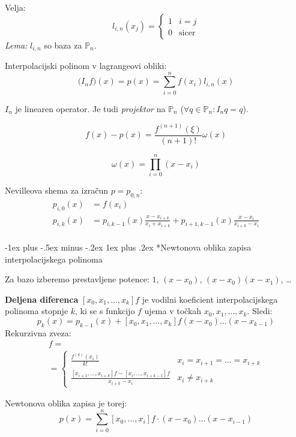\documentclass[a3paper,9pt]{extarticle}
\makeatletter
\renewcommand{\subsubsection}{\@startsection{subsubsection}{3}{0mm}%
                                {-1ex plus -.5ex minus -.2ex}%
                                {1ex plus .2ex}%
                                {\normalfont\small\bfseries}}
\makeatother
\begin{document}
\begin{multicols}{5}
Velja:
\[ 
l_{i,n}(x_j) = 
\begin{cases}
    1 & i = j \\
    0 & \text{sicer}
\end{cases}
\]
\textit{Lema:} $l_{i, n}$ so baza za $\mathbb{P}_n$.


Interpolacijski polinom v lagrangeovi obliki:
\[ \big( I_n f \big)(x) = p(x) = \sum_{i=0}^n f(x_i) l_{i,n}(x)\]

$I_n$ je linearen operator. Je tudi \textit{projektor} na $\mathbb{P}_n$ ($\forall q \in \mathbb{P}_n : I_n q = q$).

\[ f(x) - p(x) = \frac{f^{(n+1)}(\xi)}{(n+1)!} \omega(x) \]

\[ \omega(x) = \prod_{i=0}^n (x-x_i)\]

Nevilleova shema za izračun $p = p_{0,n}$:
\begin{align*}
	p_{i, 0}(x) &= f(x_i) \\
	p_{i, k}(x) &= p_{i, k-1}(x) \frac{x-x_{i+k}}{x_i + x_{i+k}} + p_{i+1, k-1}(x) \frac{x-x_i}{x_{i+k} - x_i} \\
\end{align*}

\subsubsection*{Newtonova oblika zapisa interpolacijskega polinoma}

Za bazo izberemo prestavljene potence: $1$, $(x-x_0)$, $(x-x_0)(x-x_1)$, \dots  


\textbf{Deljena diferenca} $[x_0, x_1, \dots, x_k] f$ je vodilni koeficient interpolacijskega polinoma
stopnje $k$, ki se s funkcijo $f$ ujema v točkah $x_0, x_1, \dots, x_k$. Sledi:
\[ p_k(x) = p_{k-1}(x) + [x_0, x_1, \dots, x_k] f (x-x_0)\dots (x-x_{k-1})\]
Rekurzivna zveza:
\begin{multline*}
    [x_i, x_{i+1}, \dots, x_{i+k}]f = \\
    = \begin{cases}
        \frac{f^{(k)}(x_i)}{k!} & {\scriptstyle x_i = x_{i+1} = \dots = x_{i+k}} \\
        \frac{[x_{i+1}, \dots, x_{i+k}]f- [x_i, \dots, x_{i+k-1}]f}{x_{i+k}-x_i} & {\scriptstyle x_i \neq x_{i+k} }
    \end{cases} 
\end{multline*} 

Newtonova oblika zapisa je torej:
\[ p(x) = \sum_{i=0}^n [x_0, \dots, x_i]f \cdot (x-x_0)\dots (x-x_{i-1}) \]


\end{multicols}
\end{document}

